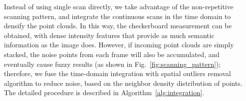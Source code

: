 \documentclass[journal]{vgtc}
\begin{document}
Instead of using single scan directly, we take advantage of the non-repetitive scanning pattern, and integrate the continuous scans in the time domain to densify the point clouds. In this way, the checkerboard measurement can be obtained, with dense intensity features that provide as much semantic information as the image does. However, if incoming point clouds are simply stacked, the noise points from each frame will also be accumulated, and eventually cause fuzzy results (as shown in Fig.~\ref{fig:scanning_pattern}); therefore, we fuse the time-domain integration with spatial outliers removal algorithm to reduce noise, based on the neighbor density distribution of points. The detailed procedure is described in Algorithm~\ref{alg:integration}.

\end{document}
